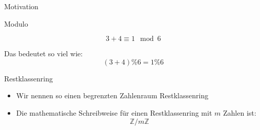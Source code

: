 \begin{frame}[fragile]{Motivation}
    \begin{center}
        \vspace{1cm}

    \end{center}
\end{frame}

\begin{frame}[fragile]{Modulo}
    \begin{center}
        \Large
        $$
        3+4 \equiv 1 \mod 6
        $$

        \pause
        Das bedeutet so viel wie:
        $$
        (3+4)\% 6 = 1 \% 6
        $$
    \end{center}
\end{frame}


\begin{frame}[fragile]{Restklassenring}
    \begin{itemize}
        \item Wir nennen so einen begrenzten Zahlenraum \alert{Restklassenring}
        \item Die mathematische Schreibweise für einen Restklassenring mit $m$ Zahlen ist:
        $$
        \mathbb Z / m\mathbb Z
        $$
    \end{itemize}
\end{frame}


